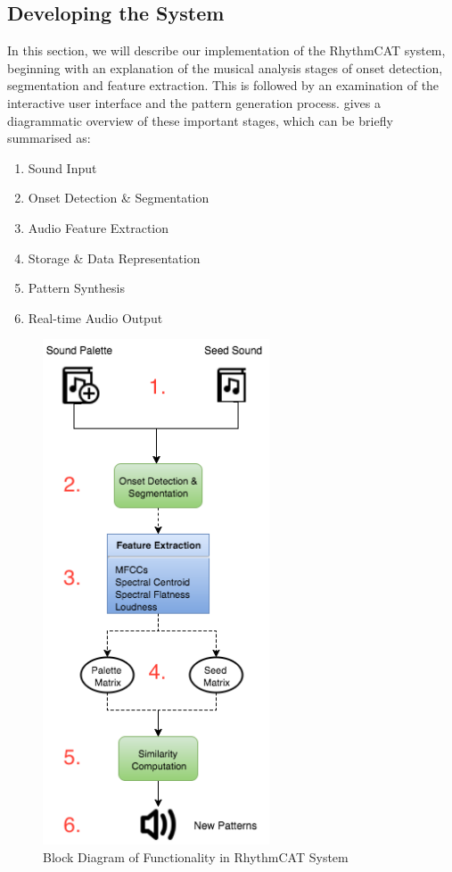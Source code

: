 \subsection{Developing the System}

In this section, we will describe our implementation of the RhythmCAT system, beginning with an explanation of the musical analysis stages of onset detection, segmentation and feature extraction. This is followed by an examination of the interactive user interface and the pattern generation process.  gives a diagrammatic overview of these important stages, which can be briefly summarised as:

\begin{enumerate}
  \item Sound Input
  \item Onset Detection \& Segmentation
  \item Audio Feature Extraction
  \item Storage \& Data Representation
  \item Pattern Synthesis
  \item Real-time Audio Output
\end{enumerate}

\begin{figure}
	\begin{center}
		\includegraphics[width=0.6\textwidth]{ch05_pyconcat/figures/rhythmcat_flowchart.png}
	\end{center}
	\caption[Block Diagram of Functionality in RhythmCAT System]{Block Diagram of Functionality in RhythmCAT System}
	\label{fig:rhythmcat_flowchart}
\end{figure}

